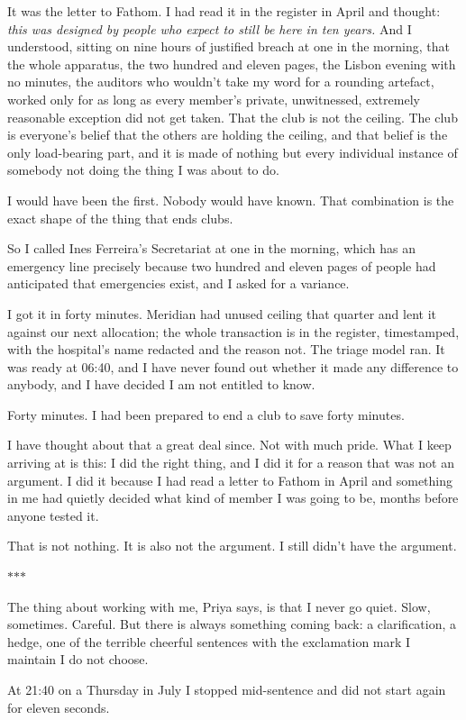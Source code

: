 \documentclass[11pt]{article}
\newcommand{\scenebreak}{%
  \par\vspace{1.1\baselineskip}%
  {\centering $\ast$\quad$\ast$\quad$\ast$\par}%
  \vspace{1.1\baselineskip}\noindent}
\begin{document}
It was the letter to Fathom. I had read it in the register in April and thought: \emph{this was designed by people who expect to still be here in ten years.} And I understood, sitting on nine hours of justified breach at one in the morning, that the whole apparatus, the two hundred and eleven pages, the Lisbon evening with no minutes, the auditors who wouldn't take my word for a rounding artefact, worked only for as long as every member's private, unwitnessed, extremely reasonable exception did not get taken. That the club is not the ceiling. The club is everyone's belief that the others are holding the ceiling, and that belief is the only load-bearing part, and it is made of nothing but every individual instance of somebody not doing the thing I was about to do.

I would have been the first. Nobody would have known. That combination is the exact shape of the thing that ends clubs.

So I called Ines Ferreira's Secretariat at one in the morning, which has an emergency line precisely because two hundred and eleven pages of people had anticipated that emergencies exist, and I asked for a variance.

I got it in forty minutes. Meridian had unused ceiling that quarter and lent it against our next allocation; the whole transaction is in the register, timestamped, with the hospital's name redacted and the reason not. The triage model ran. It was ready at 06:40, and I have never found out whether it made any difference to anybody, and I have decided I am not entitled to know.

Forty minutes. I had been prepared to end a club to save forty minutes.

I have thought about that a great deal since. Not with much pride. What I keep arriving at is this: I did the right thing, and I did it for a reason that was not an argument. I did it because I had read a letter to Fathom in April and something in me had quietly decided what kind of member I was going to be, months before anyone tested it.

That is not nothing. It is also not the argument. I still didn't have the argument.

\scenebreak
\noindent The thing about working with me, Priya says, is that I never go quiet. Slow, sometimes. Careful. But there is always something coming back: a clarification, a hedge, one of the terrible cheerful sentences with the exclamation mark I maintain I do not choose.

At 21:40 on a Thursday in July I stopped mid-sentence and did not start again for eleven seconds.
\end{document}
